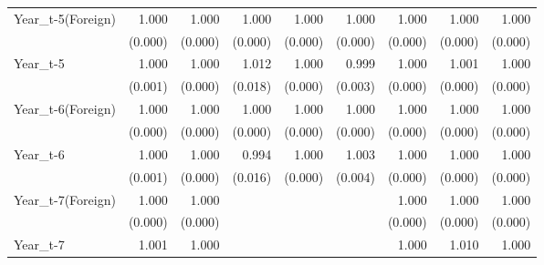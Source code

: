 \begin{table}[htbp]
\begin{tabular}{l*{8}{D{.}{.}{-1}}}
Year\_t-5(Foreign)   &       1.000\sym{\%}  &       1.000         &       1.000         &       1.000\sym{***}&       1.000         &       1.000         &       1.000         &       1.000\sym{**} \\
                    &     (0.000)         &     (0.000)         &     (0.000)         &     (0.000)         &     (0.000)         &     (0.000)         &     (0.000)         &     (0.000)         \\
Year\_t-5            &       1.000         &       1.000         &       1.012         &       1.000         &       0.999         &       1.000         &       1.001\sym{\%}  &       1.000         \\
                    &     (0.001)         &     (0.000)         &     (0.018)         &     (0.000)         &     (0.003)         &     (0.000)         &     (0.000)         &     (0.000)         \\
Year\_t-6(Foreign)   &       1.000         &       1.000\sym{***}&       1.000         &       1.000         &       1.000         &       1.000\sym{*}  &       1.000         &       1.000         \\
                    &     (0.000)         &     (0.000)         &     (0.000)         &     (0.000)         &     (0.000)         &     (0.000)         &     (0.000)         &     (0.000)         \\
Year\_t-6            &       1.000         &       1.000         &       0.994         &       1.000         &       1.003         &       1.000         &       1.000         &       1.000         \\
                    &     (0.001)         &     (0.000)         &     (0.016)         &     (0.000)         &     (0.004)         &     (0.000)         &     (0.000)         &     (0.000)         \\
Year\_t-7(Foreign)   &       1.000         &       1.000\sym{***}&                     &                     &                     &       1.000\sym{\%}  &       1.000\sym{***}&       1.000         \\
                    &     (0.000)         &     (0.000)         &                     &                     &                     &     (0.000)         &     (0.000)         &     (0.000)         \\
Year\_t-7            &       1.001\sym{**} &       1.000         &                     &                     &                     &       1.000         &       1.010\sym{*}  &       1.000\sym{***}\\

\end{tabular}
\end{table}
